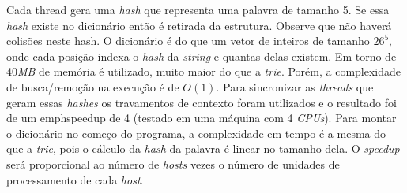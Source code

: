 \documentclass[a4paper]{article}
\begin{document}
\indent Cada thread gera uma \emph{hash} que representa uma palavra de tamanho 5. Se essa \emph{hash} existe no dicionário então é retirada da estrutura. Observe que não haverá colisões neste hash. O dicionário é do que um vetor de inteiros de tamanho \begin{math}26^5\end{math}, onde cada posição indexa o \emph{hash} da \emph{string} e quantas delas existem. Em torno de 40\emph{MB} de memória é utilizado, muito maior do que a \emph{trie}. Porém, a complexidade de busca/remoção na execução é de \begin{math}O(1)\end{math}. Para sincronizar as \emph{threads} que geram essas \emph{hashes} os travamentos de contexto foram utilizados e o resultado foi de um emph{speedup} de 4 (testado em uma máquina com 4 \emph{CPUs}). Para montar o dicionário no começo do programa, a complexidade em tempo é a mesma do que a \emph{trie}, pois o cálculo da \emph{hash} da palavra é linear no tamanho dela. O \emph{speedup} será proporcional ao número de \emph{hosts} vezes o número de unidades de processamento de cada \emph{host}.
\end{document}
